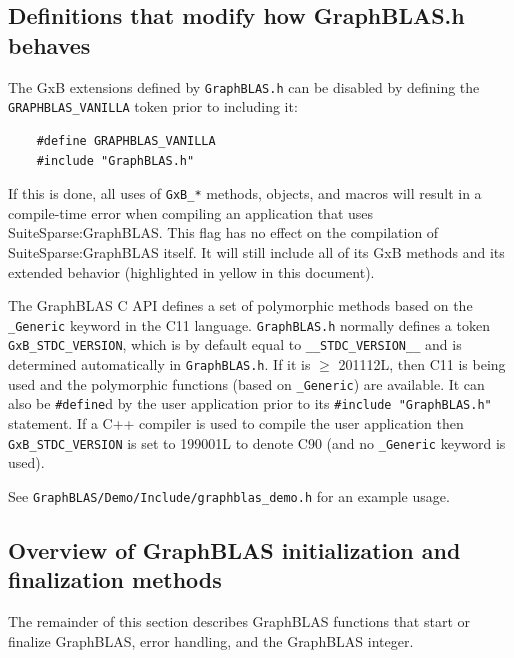 \subsection{Definitions that modify how GraphBLAS.h behaves}

The GxB extensions defined by \verb'GraphBLAS.h' can be disabled
by defining the \verb'GRAPHBLAS_VANILLA' token prior to including it:

\begin{verbatim}
    #define GRAPHBLAS_VANILLA
    #include "GraphBLAS.h"
\end{verbatim}

If this is done, all uses of \verb'GxB_*' methods, objects, and
macros will result in a compile-time error when compiling an application
that uses SuiteSparse:GraphBLAS.  This flag has no effect on the compilation
of SuiteSparse:GraphBLAS itself.  It will still include all of its GxB methods
and its extended behavior (highlighted in yellow in this document).

The GraphBLAS C API defines a set of polymorphic methods based on the
\verb'_Generic' keyword in the C11 language.  \verb'GraphBLAS.h'
normally defines a token \verb'GxB_STDC_VERSION', which is by default equal to
        \verb'__STDC_VERSION__' and is determined automatically in \verb'GraphBLAS.h'.
        If it is $\ge$ 201112L, then C11 is being used and the polymorphic
        functions (based on \verb'_Generic') are available.  It can also be
        \verb'#define'd by the user application prior to its
        \verb'#include "GraphBLAS.h"' statement.  If a C++ compiler is used to
        compile the user application then \verb'GxB_STDC_VERSION' is set to
        199001L to denote C90 (and no \verb'_Generic' keyword is used).

See \verb'GraphBLAS/Demo/Include/graphblas_demo.h' for an example usage.

\subsection{Overview of GraphBLAS initialization and finalization methods}

The remainder of this section describes GraphBLAS functions that start or
finalize GraphBLAS, error handling, and the GraphBLAS integer.

